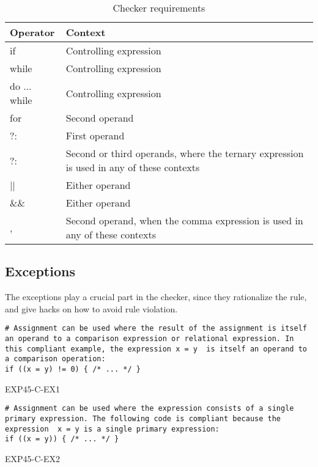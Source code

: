 \begin{table}[H]
    \centering
    \begin{tabular}{|m{}|m{}|}
        \hline
        \textbf{Operator} & \textbf{Context}  \\ 
        \hline
        if & Controlling expression \\ 
        \hline
        while & Controlling expression \\ 
        \hline
        do ... while & Controlling expression \\ 
        \hline
        for & Second operand \\ 
        \hline
        ?: & First operand \\ 
        \hline
        ?: & Second or third operands, where the ternary expression is used in any of these contexts \\ 
        \hline
        || & Either operand \\ 
        \hline
        \&\& & Either operand \\ 
        \hline
        , & Second operand, when the comma expression is used in any of these contexts \\ 
        \hline
    \end{tabular}
    \caption{Checker requirements}
    \label{tab:checker-req}
\end{table}


\subsection{Exceptions}
The exceptions play a crucial part in the checker, since they rationalize the rule, and give hacks on how to avoid rule violation. 

\begin{listing}[H]
\begin{verbatim}
# Assignment can be used where the result of the assignment is itself an operand to a comparison expression or relational expression. In this compliant example, the expression x = y  is itself an operand to a comparison operation:
if ((x = y) != 0) { /* ... */ }
\end{verbatim}
\caption{EXP45-C-EX1}
\end{listing}

\begin{listing}[H]
\begin{verbatim}
# Assignment can be used where the expression consists of a single primary expression. The following code is compliant because the expression  x = y is a single primary expression:
if ((x = y)) { /* ... */ }
\end{verbatim}
\caption{EXP45-C-EX2}
\end{listing}

